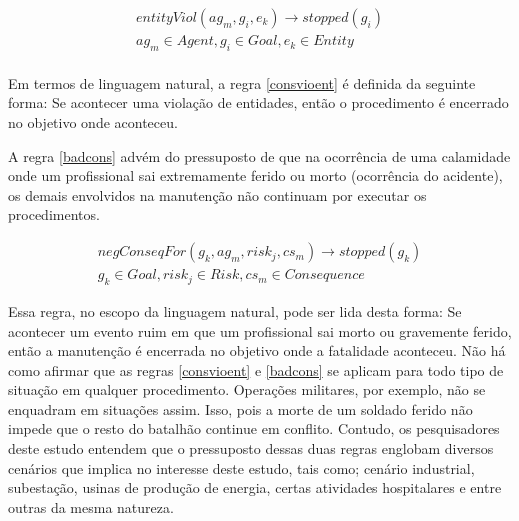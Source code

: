 \begin{eqnarray}\label{consvioent}
	entityViol(ag_m,g_i,e_k) \to stopped(g_i) \nonumber \\  
    ag_m \in Agent, g_i \in Goal, e_k \in Entity \\ \nonumber
\end{eqnarray}

Em termos de linguagem natural, a regra \ref{consvioent} é definida da seguinte forma: Se acontecer uma violação de entidades, então o procedimento é encerrado no objetivo onde aconteceu. 

A regra \ref{badcons} advém do pressuposto de que na ocorrência de uma calamidade onde um profissional sai extremamente ferido ou morto (ocorrência do acidente), os demais envolvidos na manutenção não continuam por executar os procedimentos. 
 
 \begin{eqnarray}\label{badcons}
	negConseqFor(g_k,ag_m,risk_j,cs_m) \to stopped(g_k) \nonumber \\ 
    g_k \in Goal, risk_j \in Risk, cs_m \in Consequence
\end{eqnarray}

Essa regra, no escopo da linguagem natural, pode ser lida desta forma: Se acontecer um evento ruim em que um profissional sai morto ou gravemente ferido, então a manutenção é encerrada no objetivo onde a fatalidade aconteceu. Não há como afirmar que as regras  \ref{consvioent} e \ref{badcons} se aplicam para todo tipo de situação em qualquer procedimento. Operações militares, por exemplo, não se enquadram em situações assim. Isso, pois a morte de um soldado ferido não impede que o resto do batalhão continue em conflito. Contudo, os pesquisadores deste estudo entendem que o pressuposto dessas duas regras englobam diversos cenários que implica no interesse deste estudo, tais como; cenário industrial, subestação, usinas de produção de energia, certas atividades hospitalares e entre outras da mesma natureza.  

